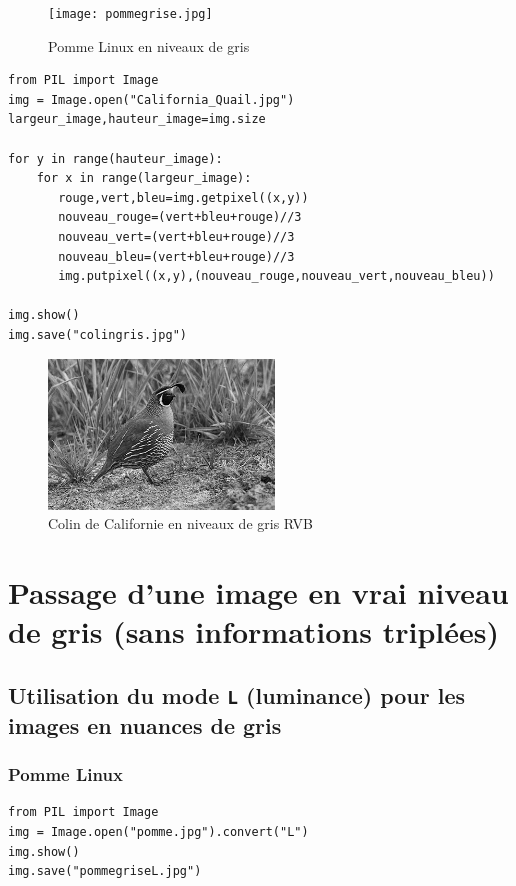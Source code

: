 \documentclass[11pt]{article}
\begin{document}
\begin{figure}[htbp]
\centering
\texttt{[image: pommegrise.jpg]}
\caption{Pomme Linux en niveaux de gris}
\end{figure}



\begin{verbatim}
from PIL import Image
img = Image.open("California_Quail.jpg")
largeur_image,hauteur_image=img.size

for y in range(hauteur_image):
    for x in range(largeur_image):
       rouge,vert,bleu=img.getpixel((x,y))
       nouveau_rouge=(vert+bleu+rouge)//3
       nouveau_vert=(vert+bleu+rouge)//3
       nouveau_bleu=(vert+bleu+rouge)//3
       img.putpixel((x,y),(nouveau_rouge,nouveau_vert,nouveau_bleu))

img.show()
img.save("colingris.jpg")
\end{verbatim}

\begin{figure}[htbp]
\centering
\includegraphics[width=6cm]{colingris.jpg}
\caption{Colin de Californie en niveaux de gris RVB}
\end{figure}

\section{Passage d'une image en vrai niveau de gris (sans informations triplées)}
\label{sec:org77c9392}


\subsection{Utilisation du mode \texttt{L} (luminance) pour les images en nuances de gris}
\label{sec:org9d9502c}

\subsubsection{Pomme Linux}
\label{sec:orge57fb85}

\begin{verbatim}
from PIL import Image
img = Image.open("pomme.jpg").convert("L")
img.show()
img.save("pommegriseL.jpg")
\end{verbatim}
\end{document}

